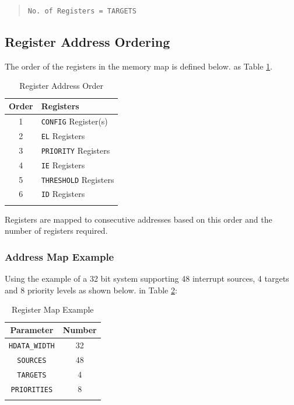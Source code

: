 \begin{quote}
\texttt{No.\ of\ Registers\ =\ TARGETS}
\end{quote}

\subsection{Register Address Ordering}

The order of the registers in the memory map is defined 
\ifdefined\MARKDOWN
below.
\else
as Table \ref{tab:REGMAP}.
\fi

\begin{longtable}[]{@{}cl@{}}	
	\toprule 
	\textbf{Order} & \textbf{Registers}\\
	\midrule
	\endhead 
	1 & \texttt{CONFIG} Register(s)\\
	2 & \texttt{EL} Registers\\
	3 & \texttt{PRIORITY} Registers\\
	4 & \texttt{IE} Registers\\
	5 & \texttt{THRESHOLD} Registers\\
	6 & \texttt{ID} Registers\\
	\bottomrule 	
	\caption{Register Address Order}
	\label{tab:REGMAP}
\end{longtable}

Registers are mapped to consecutive addresses based on this order and the
number of registers required.  

\subsubsection{Address Map Example}

Using the example of a 32 bit system supporting 48 interrupt sources, 4 targets and 8 priority levels as shown 
\ifdefined\MARKDOWN
below.
\else
in Table \ref{tab:REGMAPEX}:
\fi

\begin{longtable}[c]{@{}cc@{}}	
		\toprule 
		\textbf{Parameter}    & \textbf{Number}\\
		\midrule 
		\endhead
		\texttt{HDATA\_WIDTH} & 32\\
		\texttt{SOURCES}      & 48\\
		\texttt{TARGETS}      & 4\\
		\texttt{PRIORITIES}   & 8\\
		\bottomrule 	
 
	\caption{Register Map Example}
	\label{tab:REGMAPEX}
\end{longtable}

